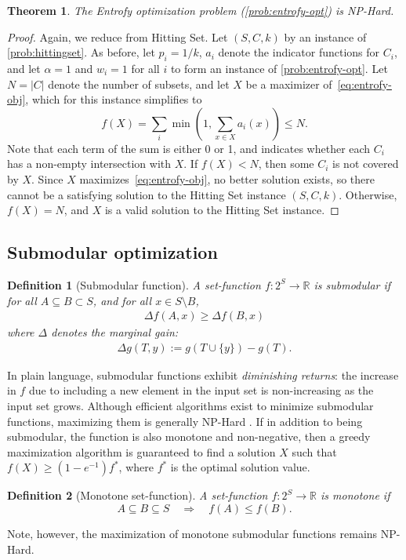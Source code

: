 \documentclass[12pt]{article}
\newtheorem{definition}{Definition}
\newtheorem{theorem}{Theorem}
\begin{document}
\begin{theorem}
    The Entrofy optimization problem (\cref{prob:entrofy-opt}) is NP-Hard.
\end{theorem}
\begin{proof}
    Again, we reduce from Hitting Set.
    Let $(S, C, k)$ by an instance of \cref{prob:hittingset}.  As before, let $p_i = 1/k$, $a_i$ denote the indicator functions for $C_i$, and let $\alpha=1$ and $w_i=1$ for all $i$ to form an instance of \cref{prob:entrofy-opt}.
    Let $N = |C|$ denote the number of subsets, and let $X$ be a maximizer of~\eqref{eq:entrofy-obj}, which for this instance simplifies to 
    \begin{equation}
        f(X) = \sum_i \min \left(1, \sum_{x\in X} a_i(x) \right) \leq N.
    \end{equation}
    Note that each term of the sum is either 0 or 1, and indicates whether each $C_i$ has a non-empty intersection with $X$.
    If $f(X) < N$, then some $C_i$ is not covered by $X$.
    Since $X$ maximizes~\eqref{eq:entrofy-obj}, no better solution exists, so there cannot be a satisfying solution to the Hitting Set instance $(S, C, k)$.
    Otherwise, $f(X) = N$, and $X$ is a valid solution to the Hitting Set instance.
\end{proof}



\subsection*{Submodular optimization}
\begin{definition}[Submodular function]
A set-function $f : 2^S \rightarrow \mathbb{R}$ is \emph{submodular} if for all $A \subseteq B \subset S$,
and for all $x \in S \setminus B$,
\begin{align}
\Delta f(A, x) \geq \Delta f(B, x) \label{submodular}
\end{align}
where $\Delta$ denotes the \emph{marginal gain}:
\begin{align}
\Delta g(T, y) := g\left(T \cup \{y\}\right) - g(T).
\end{align}
\end{definition}

In plain language, submodular functions exhibit \emph{diminishing returns}: the increase in $f$ due to including a new element in the input set is non-increasing as the input set grows.
Although efficient algorithms exist to minimize submodular functions, maximizing them is generally NP-Hard \textit{}.%
If in addition to being submodular, the function is also monotone and non-negative, then a greedy maximization algorithm is guaranteed to find a solution $X$ such that $f(X) \geq (1 - e^{-1}) f^*$, where $f^*$ is the optimal solution value.
\begin{definition}[Monotone set-function]
    A set-function $f : 2^S \rightarrow \mathbb{R}$ is \emph{monotone} if 
    \[
        A \subseteq B \subseteq S \quad\Rightarrow\quad f(A) \leq f(B).
    \]
\end{definition}
Note, however, the maximization of monotone submodular functions remains NP-Hard.
\end{document}
